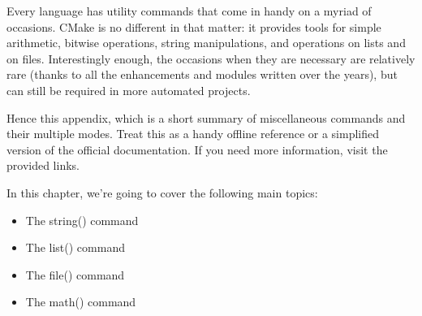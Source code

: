 Every language has utility commands that come in handy on a myriad of occasions. CMake is no different in that matter: it provides tools for simple arithmetic, bitwise operations, string manipulations, and operations on lists and on files. Interestingly enough, the occasions when they are necessary are relatively rare (thanks to all the enhancements and modules written over the years), but can still be required in more automated projects.

Hence this appendix, which is a short summary of miscellaneous commands and their multiple modes. Treat this as a handy offline reference or a simplified version of the official documentation. If you need more information, visit the provided links.

In this chapter, we're going to cover the following main topics:

\begin{itemize}
\item 
The string() command

\item 
The list() command

\item 
The file() command

\item 
The math() command
\end{itemize}



















